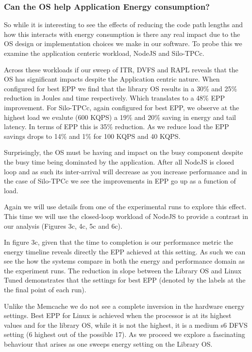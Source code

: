 \subsubsection{Can the OS help Application Energy consumption?}

So while it is interesting to see the effects of reducing the code path lengths and how this interacts with energy consumption is there any real impact due to the OS design or implementation choices we make in our software.  To probe this we examine the application centeric workload, NodeJS and Silo-TPCc.  

Across these workloads if our sweep of ITR, DVFS and RAPL reveals that the OS has significant impacts despite the Application centric nature.  When configured for best EPP we find that the library OS results in a 30\% and 25\% reduction in Joules and time respectively. Which translates to a 48\% EPP improvement.    For Silo-TPCc, again configured for best EPP, we observe at the highest load we evalute (600 KQPS) a 19\% and 20\% saving in energy and tail latency.  In terms of EPP this is 35\% reduction.  As we reduce load the EPP savings drops to 14\% and 1\% for 100 KQPS and 40 KQPS.  

Surprisingly, the OS must be having and impact on the busy component despite the busy time being dominated by the application.  After all NodeJS is closed loop and as such its inter-arrival will decrease as you increase performance and in the case of Silo-TPCc we see the improvements in EPP go up as a function of load.  

Again we will use details from one of the experimental runs to explore this effect.  This time we will use the closed-loop workload of NodeJS to provide a contrast in our analysis (Figures 3c, 4c, 5c and 6c).  

In figure 3c, given that the time to completion is our performance metric the energy timeline reveals directly the EPP achieved at this setting. As such we can see the how the systems compare in both the energy and performance domain as the experiment runs.  The reduction in slope between the Library OS and Linux Tuned demonstrates that the settings for best EPP (denoted by the labels at the the final point of each run).  

Unlike the Memcache we do not see a complete inversion in the hardware energy settings.  Best EPP for Linux is achieved when the processor is at its highest values and for the library OS, while it is not the highest, it is a medium s6 DFVS setting (6 highest out of the possible 17). As we proceed we explore a fascinating behaviour that arises as one sweeps energy setting on the Library OS.


